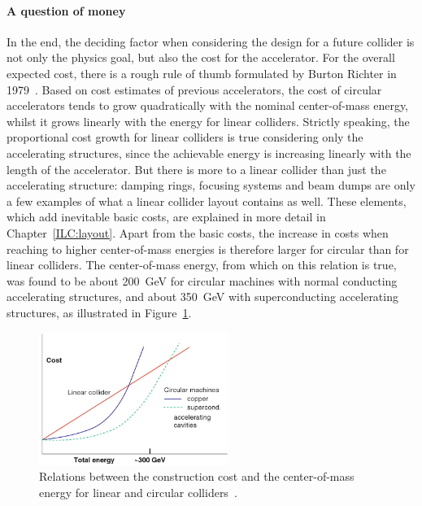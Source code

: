 \paragraph{A question of money}
In the end, the deciding factor when considering the design for a future collider is not only the physics goal, but also the cost for the accelerator.
For the overall expected cost, there is a rough rule of thumb formulated by Burton Richter in 1979~\cite[p. 87ff]{Richter}.
Based on cost estimates of previous accelerators, the cost of circular accelerators tends to grow quadratically with the nominal center-of-mass energy, whilst it grows linearly with the energy for linear colliders.
Strictly speaking, the proportional cost growth for linear colliders is true considering only the accelerating structures, since the achievable energy is increasing linearly with the length of the accelerator.
But there is more to a linear collider than just the accelerating structure: damping rings, focusing systems and beam dumps are only a few examples of what a linear collider layout contains as well.
These elements, which add inevitable basic costs, are explained in more detail in Chapter~\ref{ILC:layout}.
Apart from the basic costs, the increase in costs when reaching to higher center-of-mass energies is therefore larger for circular than for linear colliders.
The center-of-mass energy, from which on this relation is true, was found to be about \SI{200}{\GeV} for circular machines with normal conducting accelerating structures, and about \SI{350}{\GeV} with superconducting accelerating structures, as illustrated in Figure~\ref{fig:Costs}.
\begin{figure}[h]
\centering
\includegraphics[width=0.55\textwidth]{Figures/Collider_costs.png}
\caption[Construction cost of linear and circular colliders]{Relations between the construction cost and the center-of-mass energy for linear and circular \positron\electron colliders~\cite[p. 13]{Schopper}.}
\label{fig:Costs}
\end{figure}